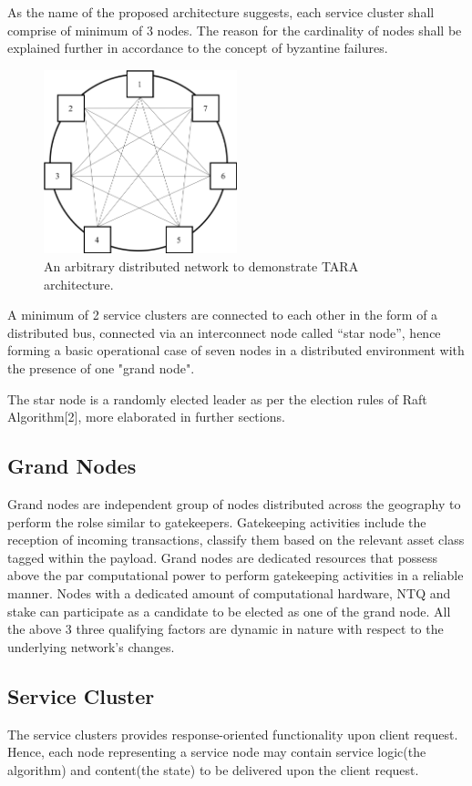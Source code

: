 \documentclass[]{article}
\begin{document}
As the name of the proposed architecture suggests, each service cluster shall comprise of minimum of 3 nodes. The reason for the cardinality of nodes shall be explained further in accordance to the concept of byzantine failures. 

\begin{figure}[h]
	\centering
	\includegraphics[width=0.5\textwidth]{Arbitrary_network_1.png}
	\caption{An arbitrary distributed network to demonstrate TARA architecture.}
	\label{fig:basic-net}
\end{figure}

A minimum of 2 service clusters are connected to each other in the form of a distributed bus, connected via an interconnect node called “star node”, hence forming a basic operational case of seven nodes in a distributed environment with the presence of one "grand node". 

The star node is a randomly elected leader as per the election rules of Raft Algorithm[2], more elaborated in further sections.

\subsection{Grand Nodes}
Grand nodes are independent group of nodes distributed across the geography to perform the rolse similar to gatekeepers.
Gatekeeping activities include the reception of incoming transactions, classify them based on the relevant asset class tagged within the payload.
Grand nodes are dedicated resources that possess above the par computational power to perform gatekeeping activities in a reliable manner. Nodes with a dedicated amount of computational hardware, NTQ and stake can participate as a candidate to be elected as one of the grand node. All the above 3 three qualifying factors are dynamic in nature with respect to the underlying network's changes.

\subsection{Service Cluster}
The service clusters provides response-oriented functionality upon client request. Hence, each node representing a service node may contain service logic(the algorithm) and content(the state) to be delivered upon the client request. 
\end{document}
